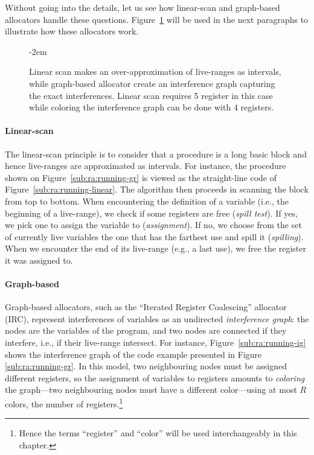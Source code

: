 {Without going into the details, let us see how linear-scan and graph-based allocators handle these questions.
Figure~\ref{fig:ra:running} will be used in the next paragraphs to illustrate how these allocators work.

\begin{figure}
    \kern-2em
  \caption{Linear scan makes an over-approximation of live-ranges as
    intervals, while graph-based allocator create an interference graph 
    capturing the exact interferences. Linear scan requires 5 register 
    in this case while coloring the interference graph can be done with 
    4 registers.}
  \label{fig:ra:running}
\end{figure}


\paragraph{Linear-scan} The linear-scan principle is to consider that a procedure is a long basic block and hence live-ranges are approximated as intervals.
For instance, the procedure shown on Figure~\ref{sub:ra:running-gr} is viewed as the straight-line code of Figure~\ref{sub:ra:running-linear}.
The algorithm then proceeds in scanning the block from top to bottom.
When encountering the definition of a variable (i.e., the beginning of a live-range), we check if some registers are free (\emph{spill test}).
If yes, we pick one to assign the variable to (\emph{assignment}). If no, we choose from the set of currently live variables the one that has the farthest use and spill it (\emph{spilling}).
When we encounter the end of its live-range (e.g., a last use), we free the register it was assigned to.

\paragraph{Graph-based}
Graph-based allocators, such as the ``Iterated Register Coalescing'' allocator (IRC), represent interferences of variables as an undirected \emph{interference graph}: the nodes are the variables of the program, and two nodes are connected if they interfere, i.e., if their live-range intersect.
For instance, Figure~\ref{sub:ra:running-ig} shows the interference graph of the code example presented in Figure \ref{sub:ra:running-gr}.
In this model, two neighbouring nodes must be assigned different registers, so the assignment of variables to registers amounts to \emph{coloring} the graph---two neighbouring nodes must have a different color---using at most $R$ colors, the number of registers.\footnote{Hence the terms ``register'' and ``color'' will be used interchangeably in this chapter.}

}
